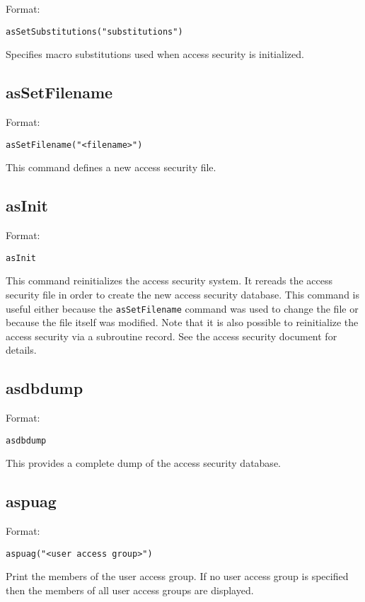 Format:

\begin{verbatim}asSetSubstitutions("substitutions")
\end{verbatim}Specifies macro substitutions used when access security is initialized.

\subsection{asSetFilename}

Format:

\begin{verbatim}asSetFilename("<filename>")
\end{verbatim}This command defines a new access security file.

\subsection{asInit}

Format:

\begin{verbatim}asInit
\end{verbatim}This command reinitializes the access security system.  It rereads the access security file in order to create the new access 
security database. This command is useful either because the \verb|asSetFilename| command was used to change the file or 
because the file itself was modified.  Note that it is also possible to reinitialize the access security via a subroutine record.  
See the access security document for details.

\subsection{asdbdump}

Format:

\begin{verbatim}asdbdump
\end{verbatim}This provides a complete dump of the access security database.

\subsection{aspuag}

Format:

\begin{verbatim}aspuag("<user access group>")
\end{verbatim}Print the members of the user access group.  If no user access group is specified then the members of all user access 
groups are displayed.

